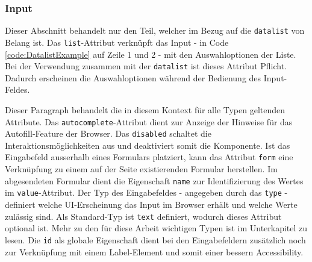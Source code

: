 \subsubsection{\color{dgray} Input}
\label{sec:input}

Dieser Abschnitt behandelt nur den Teil, welcher im Bezug auf die \texttt{datalist} von Belang ist.
Das \texttt{list}-Attribut verknüpft das Input - in Code \ref{code:DatalistExample} auf Zeile 1 und 2 - mit den Auswahloptionen der Liste.
Bei der Verwendung zusammen mit der \texttt{datalist} ist dieses Attribut Pflicht.
Dadurch erscheinen die Auswahloptionen während der Bedienung des Input-Feldes. 

Dieser Paragraph behandelt die in diesem Kontext für alle Typen geltenden Attribute.
Das \texttt{autocomplete}-Attribut dient zur Anzeige der Hinweise für das Autofill-Feature der Browser.
Das \texttt{disabled} schaltet die Interaktionsmöglichkeiten aus und deaktiviert somit die Komponente.
Ist das Eingabefeld ausserhalb eines Formulars platziert, kann das Attribut \texttt{form} eine Verknüpfung zu einem auf der Seite existierenden Formular herstellen.
Im abgesendeten Formular dient die Eigenschaft \texttt{name} zur Identifizierung des Wertes im \texttt{value}-Attribut.
Der Typ des Eingabefeldes - angegeben durch das \texttt{type} - definiert welche UI-Erscheinung das Input im Browser erhält und welche Werte zulässig sind.
Als Standard-Typ ist \texttt{text} definiert, wodurch dieses Attribut optional ist.
Mehr zu den für diese Arbeit wichtigen Typen ist im Unterkapitel \textbf{} zu lesen.
Die \texttt{id} als globale Eigenschaft dient bei den Eingabefeldern zusätzlich noch zur Verknüpfung mit einem Label-Element und somit einer bessern Accessibility.

